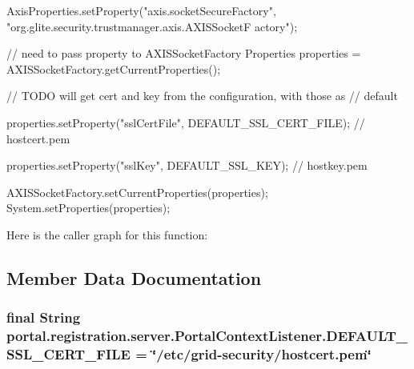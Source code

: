 \begin{DoxyCode}
                                                  {

                AxisProperties.setProperty("axis.socketSecureFactory",
                                "org.glite.security.trustmanager.axis.AXISSocketF
      actory");

                // need to pass property to AXISSocketFactory
                Properties properties = AXISSocketFactory.getCurrentProperties();
      

                // TODO will get cert and key from the configuration, with those 
      as
                // default

                properties.setProperty("sslCertFile", DEFAULT_SSL_CERT_FILE); // 
      hostcert.pem

                properties.setProperty("sslKey", DEFAULT_SSL_KEY); // hostkey.pem
      

                AXISSocketFactory.setCurrentProperties(properties);
                System.setProperties(properties);
        }
\end{DoxyCode}


Here is the caller graph for this function:




\subsection{Member Data Documentation}
\hypertarget{classportal_1_1registration_1_1server_1_1PortalContextListener_a3fbced411701333a0264f0ea12a1b0f3}{
\subsubsection[{DEFAULT\_\-SSL\_\-CERT\_\-FILE}]{\setlength{\rightskip}{0pt plus 5cm}final String {\bf portal.registration.server.PortalContextListener.DEFAULT\_\-SSL\_\-CERT\_\-FILE} = \char`\"{}/etc/grid-\/security/hostcert.pem\char`\"{}}}
\label{classportal_1_1registration_1_1server_1_1PortalContextListener_a3fbced411701333a0264f0ea12a1b0f3}


